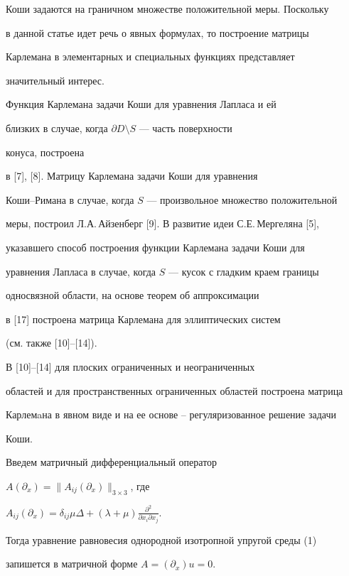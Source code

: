 Коши задаются на граничном множестве положительной меры. Поскольку 


в данной статье идет речь о явных формулах, то построение матрицы 


Карлемана в элементарных и специальных функциях представляет 


значительный интерес. 


 


Функция Карлемана задачи Коши для уравнения Лапласа и ей 


близких в случае, когда $\partial D\setminus S$ --- часть поверхности 


конуса, построена 


в [7], [8]. Матрицу Карлемана задачи Коши для уравнения 


Коши--Римана в случае, когда $S$ --- произвольное множество положительной 


меры, построил Л.А.\,Айзенберг [9]. В развитие идеи С.Е.\,Мергеляна [5], 


указавшего способ построения функции Карлемана задачи Коши для 


уравнения Лапласа в случае, когда $S$ --- кусок с гладким краем границы 


односвязной области, на основе теорем об аппроксимации 


в [17] построена матрица Карлемана для эллиптических систем 


(см. также [10]--[14]). 


В [10]--[14] для плоских ограниченных и неограниченных 


областей и для пространственных ограниченных областей построена матрица 


Карлемaна в явном виде и на ее основе -- регуляризованное решение задачи 


Коши. 


 


Введем матричный дифференциальный оператор 


$A(\partial_x)=\|A_{ij}(\partial_x)\|_{3\times 3}$, где 


$A_{ij}(\partial_x)=\delta_{ij}\mu\Delta+(\lambda+\mu) 


\frac{\partial^2}{\partial x_i\partial x_j}$. 


Тогда уравнение равновесия однородной изотропной упругой среды (1) 


запишется в матричной форме $A=(\partial_x)u=0$. 


